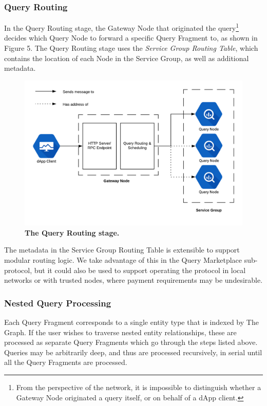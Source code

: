 \documentclass[12pt]{article}
\begin{document}
\subsubsection*{Query Routing}
In the Query Routing stage, the Gateway Node that originated the query\footnote{From the perspective of the network, it is impossible to distinguish whether a Gateway Node originated a query itself, or on behalf of a dApp client.} decides which Query Node to forward a specific Query Fragment to, as shown in Figure 5. The Query Routing stage uses the \textit{Service Group Routing Table}, which contains the location of each Node in the Service Group, as well as additional metadata.
\begin{figure}[H]
\caption{\textbf{The Query Routing stage.}}
\includegraphics[width=1\textwidth]{media/image9.png}
\end{figure}
\noindent
The metadata in the Service Group Routing Table is extensible to support modular routing logic. We take advantage of this in the Query Marketplace sub-protocol, but it could also be used to support operating the protocol in local networks or with trusted nodes, where payment requirements may be undesirable.
\subsubsection*{Nested Query Processing}
Each Query Fragment corresponds to a single entity type that is indexed by The Graph. If the user wishes to traverse nested entity relationships, these are processed as separate Query Fragments which go through the steps listed above. Queries may be arbitrarily deep, and thus are processed recursively, in serial until all the Query Fragments are processed.
\end{document}
